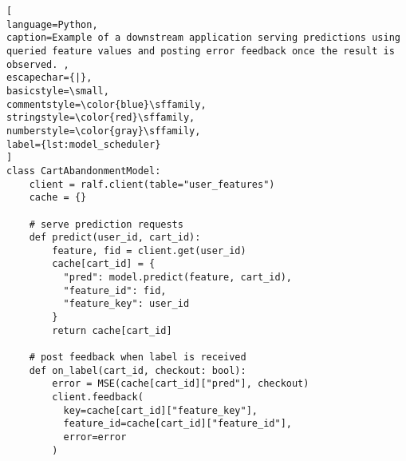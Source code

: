 \begin{lstlisting}[
language=Python, 
caption=Example of a downstream application serving predictions using queried feature values and posting error feedback once the result is observed. , 
escapechar={|},  
basicstyle=\small,
commentstyle=\color{blue}\sffamily,
stringstyle=\color{red}\sffamily,
numberstyle=\color{gray}\sffamily,
label={lst:model_scheduler}
]
class CartAbandonmentModel:
    client = ralf.client(table="user_features")
    cache = {}

    # serve prediction requests 
    def predict(user_id, cart_id): 
        feature, fid = client.get(user_id)
        cache[cart_id] = {
          "pred": model.predict(feature, cart_id),
          "feature_id": fid, 
          "feature_key": user_id
        }
        return cache[cart_id]
        
    # post feedback when label is received 
    def on_label(cart_id, checkout: bool):
        error = MSE(cache[cart_id]["pred"], checkout)
        client.feedback(
          key=cache[cart_id]["feature_key"],
          feature_id=cache[cart_id]["feature_id"],
          error=error
        )
\end{lstlisting}